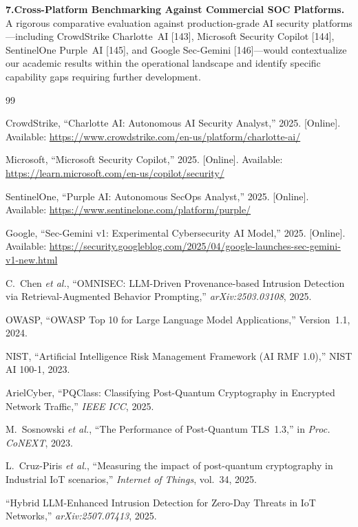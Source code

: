 \documentclass[12pt,a4paper]{article}
\begin{document}
\textbf{7.\;Cross-Platform Benchmarking Against Commercial SOC Platforms.}
A rigorous comparative evaluation against production-grade AI security
platforms---including CrowdStrike Charlotte~AI [143], Microsoft Security
Copilot [144], SentinelOne Purple~AI [145], and Google
Sec-Gemini [146]---would contextualize our academic results within the
operational landscape and identify specific capability gaps requiring
further development.


\begin{thebibliography}{99}

CrowdStrike, ``Charlotte AI: Autonomous AI Security Analyst,'' 2025.
[Online]. Available:
\url{https://www.crowdstrike.com/en-us/platform/charlotte-ai/}

Microsoft, ``Microsoft Security Copilot,'' 2025. [Online]. Available:
\url{https://learn.microsoft.com/en-us/copilot/security/}

SentinelOne, ``Purple AI: Autonomous SecOps Analyst,'' 2025. [Online].
Available: \url{https://www.sentinelone.com/platform/purple/}

Google, ``Sec-Gemini v1: Experimental Cybersecurity AI Model,'' 2025.
[Online]. Available:
\url{https://security.googleblog.com/2025/04/google-launches-sec-gemini-v1-new.html}

C.~Chen \textit{et al.}, ``OMNISEC: LLM-Driven Provenance-based Intrusion
Detection via Retrieval-Augmented Behavior Prompting,''
\textit{arXiv:2503.03108}, 2025.

OWASP, ``OWASP Top 10 for Large Language Model Applications,'' Version~1.1,
2024.

NIST, ``Artificial Intelligence Risk Management Framework (AI RMF 1.0),''
NIST AI 100-1, 2023.

ArielCyber, ``PQClass: Classifying Post-Quantum Cryptography in Encrypted
Network Traffic,'' \textit{IEEE ICC}, 2025.

M.~Sosnowski \textit{et al.}, ``The Performance of Post-Quantum TLS~1.3,''
in \textit{Proc. CoNEXT}, 2023.

L.~Cruz-Piris \textit{et al.}, ``Measuring the impact of post-quantum
cryptography in Industrial IoT scenarios,'' \textit{Internet of Things},
vol.~34, 2025.

``Hybrid LLM-Enhanced Intrusion Detection for Zero-Day Threats in IoT
Networks,'' \textit{arXiv:2507.07413}, 2025.

\end{thebibliography}
\end{document}
